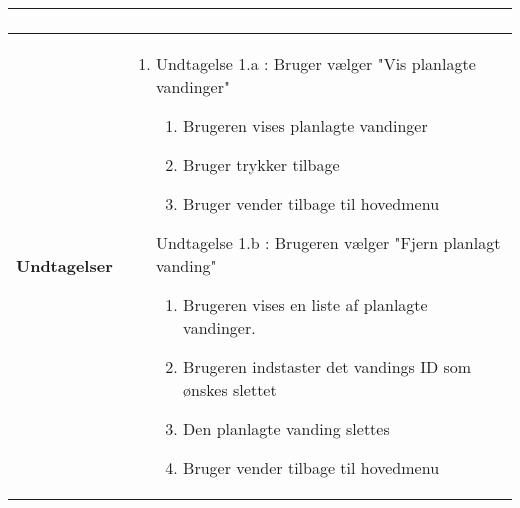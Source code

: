 \begin{center}
\begin{longtable}{|p{6cm}|p{8cm}|}
\begin{enumerate}
			\end{enumerate}\\\hline
		\textbf{Undtagelser}					
			&\begin{enumerate}
				\item Undtagelse 1.a : Bruger vælger "Vis planlagte vandinger"
					\begin{enumerate}
						\item Brugeren vises planlagte vandinger 
						\item Bruger trykker tilbage
						\item Bruger vender tilbage til hovedmenu	
					\end{enumerate}	
				\item [Undtagelse 1.b] : Brugeren vælger "Fjern planlagt vanding"
					\begin{enumerate}
						\item Brugeren vises en liste af planlagte vandinger.
						\item Brugeren indstaster det vandings ID som ønskes slettet
						\item Den planlagte vanding slettes	
						\item Bruger vender tilbage til hovedmenu
					\end{enumerate}	
			\end{enumerate}\\\hline
	\end{longtable}
	\label{UC3} 
\end{center}

